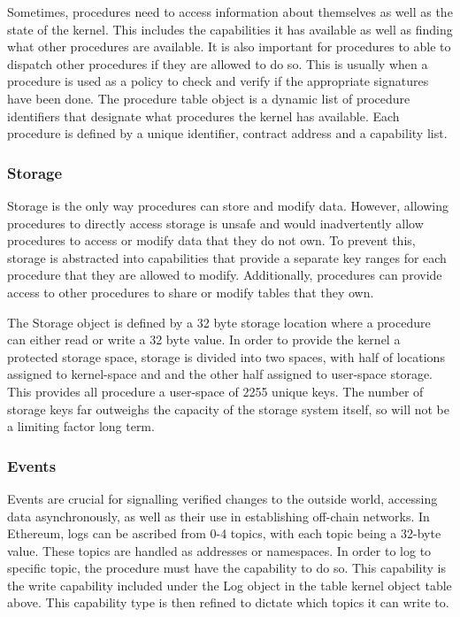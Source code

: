 \documentclass[english,a4paper]{article}
\let\oldparagraph\subsubsection
\renewcommand{\subsubsection}[1]{\oldparagraph{#1}\mbox{}}
\begin{document}
Sometimes, procedures need to access information about themselves as
well as the state of the kernel. This includes the capabilities it has
available as well as finding what other procedures are available. It is
also important for procedures to able to dispatch other procedures if
they are allowed to do so. This is usually when a procedure is used as a
policy to check and verify if the appropriate signatures have been done.
The procedure table object is a dynamic list of procedure identifiers
that designate what procedures the kernel has available. Each procedure
is defined by a unique identifier, contract address and a capability
list.

\subsubsection{Storage}\label{storage}

Storage is the only way procedures can store and modify data. However,
allowing procedures to directly access storage is unsafe and would
inadvertently allow procedures to access or modify data that they do not
own. To prevent this, storage is abstracted into capabilities that
provide a separate key ranges for each procedure that they are allowed
to modify. Additionally, procedures can provide access to other
procedures to share or modify tables that they own.

The Storage object is defined by a 32 byte storage location where a
procedure can either read or write a 32 byte value. In order to provide
the kernel a protected storage space, storage is divided into two
spaces, with half of locations assigned to kernel-space and and the
other half assigned to user-space storage. This provides all procedure a
user-space of 2255 unique keys. The number of storage keys far outweighs
the capacity of the storage system itself, so will not be a limiting
factor long term.

\subsubsection{Events}\label{events}

Events are crucial for signalling verified changes to the outside world,
accessing data asynchronously, as well as their use in establishing
off-chain networks. In Ethereum, logs can be ascribed from 0-4 topics,
with each topic being a 32-byte value. These topics are handled as
addresses or namespaces. In order to log to specific topic, the
procedure must have the capability to do so. This capability is the
write capability included under the Log object in the table kernel
object table above. This capability type is then refined to dictate
which topics it can write to.
\end{document}
